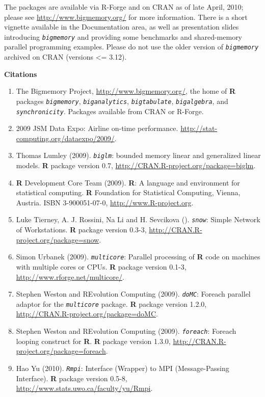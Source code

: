 \documentclass[12pt]{article}
\newcommand{\proglang}[1]{\textbf{#1}}
\newcommand{\pkg}[1]{\texttt{\textsl{#1}}}
\begin{document}
The packages are available via R-Forge and on CRAN as of
late April, 2010; please see
\url{http://www.bigmemory.org/} for more information.
There is a short vignette available in the Documentation area,
as well as presentation slides introducing \pkg{bigmemory}
and providing some benchmarks and shared-memory parallel programming
examples.  Please do not use the older version of \pkg{bigmemory} 
archived on CRAN (versions <= 3.12).

\newpage

\noindent
{\bf Citations}
\vspace*{0.5cm}

\begin{enumerate}
\item The Bigmemory Project, \url{http://www.bigmemory.org/}, the home of \proglang{R} packages
\pkg{bigmemory}, \pkg{biganalytics}, \pkg{bigtabulate}, \pkg{bigalgebra}, and
\pkg{synchronicity}.  Packages available from CRAN or R-Forge.

\item 2009 JSM Data Expo: Airline on-time performance.  \url {http://stat-computing.org/dataexpo/2009/}.

\item Thomas Lumley (2009). \pkg{biglm}: bounded memory linear and generalized
  linear models. \proglang{R} package version 0.7,
  \url{http://CRAN.R-project.org/package=biglm}.

\item \proglang{R} Development Core Team (2009). \proglang{R}: A language and environment for
  statistical computing. \proglang{R} Foundation for Statistical Computing,
  Vienna, Austria. ISBN 3-900051-07-0, \url{http://www.R-project.org}.

\item Luke Tierney, A. J. Rossini, Na Li and H. Sevcikova (). \pkg{snow}: Simple
  Network of Workstations. \proglang{R} package version 0.3-3,
  \url{http://CRAN.R-project.org/package=snow}.

\item Simon Urbanek (2009). \pkg{multicore}: Parallel processing of \proglang{R} code on
  machines with multiple cores or CPUs. \proglang{R} package version 0.1-3,
  \url{http://www.rforge.net/multicore/}.

\item Stephen Weston and REvolution Computing (2009). \pkg{doMC}: Foreach parallel adaptor for the
  \pkg{multicore} package. \proglang{R} package version 1.2.0,
  \url{http://CRAN.R-project.org/package=doMC}.

\item Stephen Weston and REvolution Computing (2009). \pkg{foreach}: Foreach looping
construct for \proglang{R}. \proglang{R} package version 1.3.0,
\url{http://CRAN.R-project.org/package=foreach}.

\item Hao Yu (2010).  \pkg{Rmpi}: Interface (Wrapper) to MPI (Message-Passing Interface).
  \proglang{R} package version 0.5-8, \url{http://www.stats.uwo.ca/faculty/yu/Rmpi}.
\end{enumerate}


\end{document}
